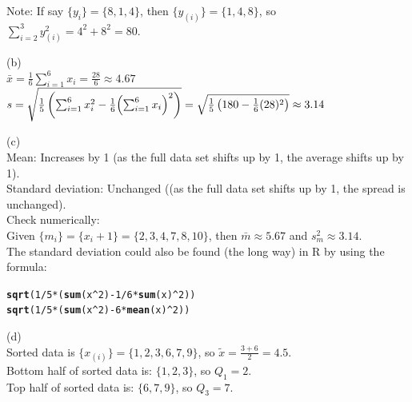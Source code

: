 \documentclass[bigtut]{tutorial}\usepackage[]{graphicx}\usepackage[]{color}
\makeatletter
\newcommand{\hlnum}[1]{\textcolor[rgb]{0.686,0.059,0.569}{#1}}%
\newcommand{\hlopt}[1]{\textcolor[rgb]{0,0,0}{#1}}%
\newcommand{\hlstd}[1]{\textcolor[rgb]{0.345,0.345,0.345}{#1}}%
\newcommand{\hlkwd}[1]{\textcolor[rgb]{0.737,0.353,0.396}{\textbf{#1}}}%
\newenvironment{kframe}{%
 \def\at@end@of@kframe{}%
 \ifinner\ifhmode%
  \def\at@end@of@kframe{\end{minipage}}%
  \begin{minipage}{\columnwidth}%
 \fi\fi%
 \def\FrameCommand##1{\hskip\@totalleftmargin \hskip-\fboxsep
 \colorbox{shadecolor}{##1}\hskip-\fboxsep
     \hskip-\linewidth \hskip-\@totalleftmargin \hskip\columnwidth}%
 \MakeFramed {\advance\hsize-\width
   \@totalleftmargin\z@ \linewidth\hsize
   \@setminipage}}%
 {\par\unskip\endMakeFramed%
 \at@end@of@kframe}
\newenvironment{knitrout}{}{} %
\makeatother
\begin{document}
\begin{tutorial}
\begin{questions}
\begin{solution}
Note: If say $\{ y_{i} \} = \{ 8,1,4 \}$, then $\{ y_{(i)} \} = \{ 1,4,8 \}$, so $\sum_{i=2}^3 y_{(i)}^2 = 4^2 + 8^2 = 80$. 

\vspace{.5cm}
(b) \\
$\bar{x} = \frac{1}{6} \sum_{i=1}^{6} x_{i} = \frac{28}{6} \approx 4.67 $ \\
$s= \sqrt { \frac1{5}\left( \sum_{i=1}^6 x_i^2 - \frac{1}{6} \Bigl(\sum_ {i=1}^6 x_i\Bigr)^2\right) } = \sqrt { \frac1{5}\left( 180 - \frac{1}{6} (28)^2 \right) } \approx 3.14$ 


\vspace{.5cm}
(c) \\
Mean: Increases by 1 (as the full data set shifts up by 1, the average shifts up by 1). \\
Standard deviation: Unchanged  ((as the full data set shifts up by 1, the spread is unchanged). \\

Check numerically: \\
Given $\{ m_{i} \}  = \{ x_{i} + 1 \} = \{ 2,3,4,7,8,10 \}$, then $\bar{m} \approx 5.67$ and
$s_{m}^2 \approx 3.14$.  \\

The standard deviation could also be found (the long way) in R by using the formula:
\begin{knitrout}
\color{fgcolor}\begin{kframe}
\begin{alltt}
\hlkwd{sqrt}\hlstd{(} \hlnum{1}\hlopt{/}\hlnum{5}\hlopt{*}\hlstd{(}\hlkwd{sum}\hlstd{(x}\hlopt{^}\hlnum{2}\hlstd{)} \hlopt{-} \hlnum{1}\hlopt{/}\hlnum{6}\hlopt{*}\hlkwd{sum}\hlstd{(x)}\hlopt{^}\hlnum{2}\hlstd{) )}
\hlkwd{sqrt}\hlstd{(} \hlnum{1}\hlopt{/}\hlnum{5}\hlopt{*}\hlstd{(}\hlkwd{sum}\hlstd{(x}\hlopt{^}\hlnum{2}\hlstd{)} \hlopt{-} \hlnum{6}\hlopt{*}\hlkwd{mean}\hlstd{(x)}\hlopt{^}\hlnum{2}\hlstd{) )}
\end{alltt}
\end{kframe}
\end{knitrout}

\vspace{.5cm}
(d) \\
Sorted data is $\{ x_{(i)} \} = \{ 1,2,3,6,7,9 \}$, so $\tilde{x} = \frac{3+6}{2} = 4.5$. \\
Bottom half of sorted data is: $\{ 1,2,3 \}$, so $Q_{1}=2$. \\
Top half of sorted data is: $\{ 6,7,9 \}$, so $Q_{3}=7$. \\


\end{solution}
\end{questions}
\end{tutorial}
\end{document}
